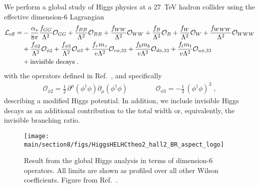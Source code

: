 We perform a global study of Higgs physics at a 27~TeV hadron collider
using the effective dimension-6 Lagrangian~\cite{Brivio:2017vri} 
\begin{align}
\mathcal{L}_\text{eff} 
= & - \frac{\alpha_s }{8 \pi} \frac{f_{GG}}{\Lambda^2} \mathcal{O}_{GG}  
    + \frac{f_{BB}}{\Lambda^2} \mathcal{O}_{BB} 
    + \frac{f_{WW}}{\Lambda^2} \mathcal{O}_{WW} 
    + \frac{f_B}{\Lambda^2} \mathcal{O}_B 
    + \frac{f_W}{\Lambda^2} \mathcal{O}_W 
    + \frac{f_{WWW}}{\Lambda^2} \mathcal{O}_{WWW} \notag \\ 
  &  + \frac{f_{\phi 2}}{\Lambda^2} \mathcal{O}_{\phi 2} 
    + \frac{f_{\phi 3}}{\Lambda^2} \mathcal{O}_{\phi 3} 
    + \frac{f_\tau m_\tau}{v \Lambda^2} \mathcal{O}_{e\phi,33} 
    + \frac{f_b m_b}{v \Lambda^2} \mathcal{O}_{d\phi,33} 
    + \frac{f_t m_t}{v \Lambda^2} \mathcal{O}_{u\phi,33} \notag \\
  & + \text{invisible decays} \; .
\label{eq:ourleff}
\end{align}
%
with the operators defined in Ref.~\cite{Butter:2016cvz}, 
and specifically
%
\begin{align}
\mathcal{O}_{\phi 2} = \frac{1}{2} \, \partial^\mu (\phi^\dagger \phi) \partial_\mu (\phi^\dagger \phi)  
\qquad \qquad
\mathcal{O}_{\phi 3} = -\frac{1}{3} \, (\phi^\dagger \phi)^3 \; ,
\label{eq:ope23}
\end{align}
%
describing a modified Higgs potential. In addition, we include invisible 
Higgs decays as an additional contribution to the total width or, equivalently, 
the invisible branching ratio.
\begin{figure}[b!]
\centering
\texttt{[image: \\main/section8/figs/HiggsHELHCtheo2\_hall2\_BR\_aspect\_logo]}
\caption{Result from the global Higgs analysis in terms of dimension-6
  operators. All limits are shown as profiled over all other Wilson
  coefficients. Figure from Ref.~\cite{Biekotter:2018jzu}.}
\label{fig:d6}
\end{figure}

